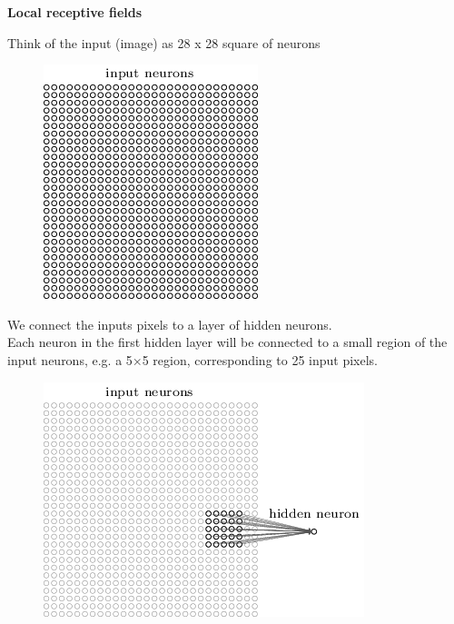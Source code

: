 \documentclass[10pt, compress]{beamer}
\begin{document}
\begin{frame}
  \vspace{0.6cm}
  \textbf{Local receptive fields} \\
  \begin{multicols}{2}
    Think of the input (image) as 28 x 28 square of neurons
    \columnbreak
    \begin{figure}
      \includegraphics[width=.6\linewidth]{imgs/cnn/cnn_1}
    \end{figure}
  \end{multicols}
  \begin{multicols}{2}
    We connect the inputs pixels to a layer of hidden neurons. \\
    Each neuron in the first hidden layer will be connected to a small region of the input neurons, e.g. a 5×5 region, corresponding to 25 input pixels.
    \columnbreak
    \begin{figure}
      \includegraphics[width=.8\linewidth]{imgs/cnn/cnn_2}
    \end{figure}
  \end{multicols}
\end{frame}
\end{document}
